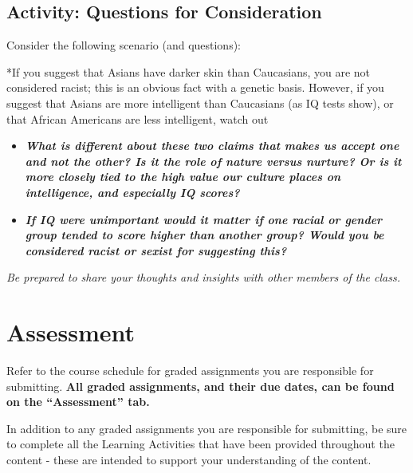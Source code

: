 \documentclass[
]{book}
\providecommand{\tightlist}{%
  \setlength{\itemsep}{0pt}\setlength{\parskip}{0pt}}
\begin{document}
\hypertarget{activity-questions-for-consideration-1}{%
\subsection*{Activity: Questions for Consideration}\label{activity-questions-for-consideration-1}}

\begin{reflect}
Consider the following scenario (and questions):

*If you suggest that Asians have darker skin than Caucasians, you are not considered racist; this is an obvious fact with a genetic basis. However, if you suggest that Asians are more intelligent than Caucasians (as IQ tests show), or that African Americans are less intelligent, watch out

\begin{itemize}
\tightlist
\item
  \textbf{\emph{What is different about these two claims that makes us accept one and not the other? Is it the role of nature versus nurture? Or is it more closely tied to the high value our culture places on intelligence, and especially IQ scores?}}
\item
  \textbf{\emph{If IQ were unimportant would it matter if one racial or gender group tended to score higher than another group? Would you be considered racist or sexist for suggesting this?}}
\end{itemize}

\emph{Be prepared to share your thoughts and insights with other members of the class.}
\end{reflect}

\hypertarget{assessment-1}{%
\section*{Assessment}\label{assessment-1}}

\begin{assessment}
Refer to the course schedule for graded assignments you are responsible for submitting. \textbf{All graded assignments, and their due dates, can be found on the ``Assessment'' tab.}

In addition to any graded assignments you are responsible for submitting, be sure to complete all the Learning Activities that have been provided throughout the content - these are intended to support your understanding of the content.
\end{assessment}
\end{document}
